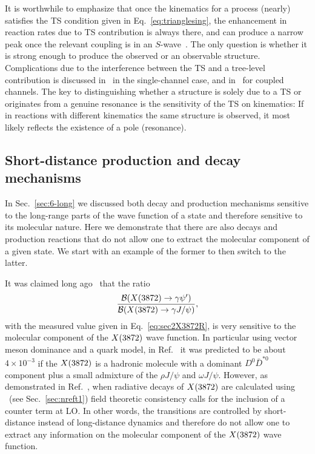 It is worthwhile to emphasize that once the kinematics for a process (nearly) satisfies
the TS condition given in Eq.~\eqref{eq:trianglesing},  the
enhancement in reaction rates due to TS contribution is always there, and can
produce a narrow peak once the relevant coupling is in an
$S$-wave~\cite{Bayar:2016ftu}.
The only question is whether it is strong enough to produce the observed or an
observable structure. Complications due to the interference between
the TS and a tree-level contribution is discussed
in~\cite{Schmid:1967ojm,Goebel:1982yb} in the single-channel case, and
in~\cite{Anisovich:1995ab,Szczepaniak:2015hya} for coupled channels.
The key to distinguishing whether a structure is
solely due to a TS or originates from a genuine resonance is the sensitivity of
the TS on kinematics: If in reactions with different kinematics the same structure is
observed, it most likely reflects the existence of a pole (resonance).


\subsection{Short-distance production and decay mechanisms}
\label{sec:6-short}

In Sec.~\ref{sec:6-long} we discussed both decay and production mechanisms
sensitive to the long-range parts of the wave function of a state and therefore
sensitive to its molecular nature. Here we demonstrate that there are
also decays and production reactions that do not allow one to extract the
molecular component of a given state. We start with an example of the former
to then switch to the latter.

It was claimed long ago~\cite{Swanson:2004pp} that the ratio \[
\frac{\mathcal{B}(X(3872)\to \gamma\psi') }{\mathcal{B}(X(3872)\to \gamma J/\psi) }, \]
with the measured value given in Eq.~\eqref{eq:sec2X3872R}, is very sensitive to
the molecular component of the $X(3872)$ wave function. In particular using vector
meson dominance and  a quark model, in Ref.~\cite{Swanson:2004pp} it was
predicted to be about $4\times10^{-3}$ if
the $X(3872)$ is a hadronic molecule with a dominant $D^0\bar D^{*0}$ component plus
a small admixture of the $\rho J/\psi$ and $\omega J/\psi$. However, as
demonstrated in Ref.~\cite{Guo:2014taa}, when radiative decays of $X(3872)$ are
calculated using \nreft~(see Sec.~\ref{sec:nreft1}) field theoretic consistency
calls for the inclusion of a counter term at LO. In other words, the transitions
are controlled by short-distance instead of long-distance dynamics and therefore
do not allow one to extract any information on the molecular component of the
$X(3872)$ wave function.



